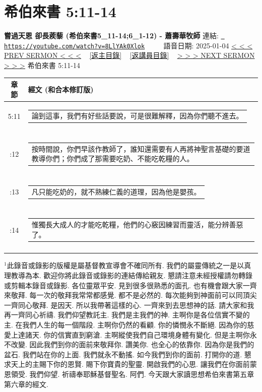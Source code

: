 \documentclass{book}
\begin{document}
\section{希伯來書 5:11-14}
\label{sec:8LlYAk0Xlok}
\textbf{嘗過天恩 卻長蒺藜 (希伯來書5\_11-14;6\_1-12) - 蕭壽華牧師}
\newline
\newline
連結: \href{https://youtube.com/watch?v=8LlYAk0Xlok}{\texttt{ https://youtube.com/watch?v=8LlYAk0Xlok}} ~~~~ 語音日期: 2025-01-04 
\newline
\newline
\hyperref[sec:toZa1ewaUWE]{< < < PREV SERMON < < <}
~
\hyperlink{toc}{[返主目錄]}
~
\hyperref[ch:preacher4]{[返講員目錄]}
~
\hyperref[sec:prT7wwZLltI]{> > > NEXT SERMON > > >}
\newline
\newline
希伯來書 5:11-14
\newline
\begin{longtable}{cl}
\hline
\hline
章節 & 經文 (和合本修訂版)\\
\hline
5:11 & \begin{tabularx}{0.7\textwidth}{X} 論到這事，我們有好些話要說，可是很難解釋，因為你們聽不進去。 \end{tabularx} \\ \\ \relax
5:12 & \begin{tabularx}{0.7\textwidth}{X} 按時間說，你們早該作教師了，誰知還需要有人再將神聖言基礎的要道教導你們；你們成了那需要吃奶、不能吃乾糧的人。 \end{tabularx} \\ \\ \relax
5:13 & \begin{tabularx}{0.7\textwidth}{X} 凡只能吃奶的，就不熟練仁義的道理，因為他是嬰孩。 \end{tabularx} \\ \\ \relax
5:14 & \begin{tabularx}{0.7\textwidth}{X} 惟獨長大成人的才能吃乾糧，他們的心竅因練習而靈活，能分辨善惡了。 \end{tabularx} \\ \\
[1ex]
\hline
\hline
\end{longtable}
$^{1}$此錄音或錄影的版權是屬基督教宣導會不確同所有.
我們的屬靈傳統之一是以真理教導為本.
歡迎你將此錄音或錄影的連結傳給親友.
懇請注意未經授權請勿轉錄或剪輯本錄音或錄影.
各位靈眾平安.
見到很多很熟悉的面孔.
也有機會跟大家一齊來敬拜.
每一次的敬拜我常常都感覺.
都不是必然的.
每次能夠到神面前可以同頂尖一齊同心敬拜.
是因天.
所以我帶著這樣的心.
一齊來到去思想神的話.
請大家和我再一齊同心祈禱.
我們仰望教託主.
我們是主我們的神.
主啊你是各位信實不變的主.
在我們人生的每一個階段.
主啊你仍然的看顧.
你的憐憫永不斷絕.
因為你的慈愛上達諸天.
你的信實直到窮滄.
主啊縱使我們自己環境身體有變化.
但是主啊你永不改變.
因此我們到你的面前來敬拜你.
讚美你.
也全心的依靠你.
因為你是我們的盆石.
我們站在你的上面.
我們就永不動搖.
如今我們到你的面前.
打開你的道.
懇求天上的主賜下你的恩賢.
賜下你寶貴的聖靈.
開啟我們的心思.
讓我們在你面前蒙恩領受.
我們仰望.
祈禱奉耶穌基督聖名.
阿們.
今天跟大家讀思想希伯來書第五章第六章的經文.
\end{document}
